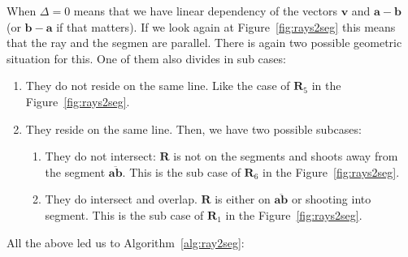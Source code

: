 When $\Delta = 0$ means that we have linear dependency of the vectors $\mathbf{v}$ and $\mathbf{a} - \mathbf{b}$ (or $\mathbf{b} - \mathbf{a}$ if that matters).
If we look again at Figure~\ref{fig:rays2seg} this means that the ray and the segmen are parallel.
There is again two possible geometric situation for this. One of them also divides in sub cases: 
\begin{enumerate}
  \item They do not reside on the same line. Like the case of $\mathbf{R}_5$ in the Figure~\ref{fig:rays2seg}.
  \item They reside on the same line. Then, we have two possible subcases:
  \begin{enumerate}
    \item They do not intersect: $\mathbf{R}$ is not on the segments and shoots away from the segment $\overline{\mathbf{a}\mathbf{b}}$. This is the sub case of $\mathbf{R}_6$ in the Figure~\ref{fig:rays2seg}.
    \item They do intersect and overlap. $\mathbf{R}$ is either on $\overline{\mathbf{a}\mathbf{b}}$ or shooting into segment. This is the sub case of $\mathbf{R}_1$ in the Figure~\ref{fig:rays2seg}.
  \end{enumerate}
\end{enumerate}

All the above led us to Algorithm~\ref{alg:ray2seg}:


